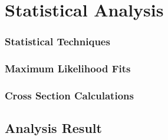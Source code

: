 \chapter{Statistical Analysis}
\label{analysis_chapter}

\subsection{Statistical Techniques}

\subsection{Maximum Likelihood Fits}

\subsection{Cross Section Calculations}

\section{Analysis Result}
\label{neymanana}

